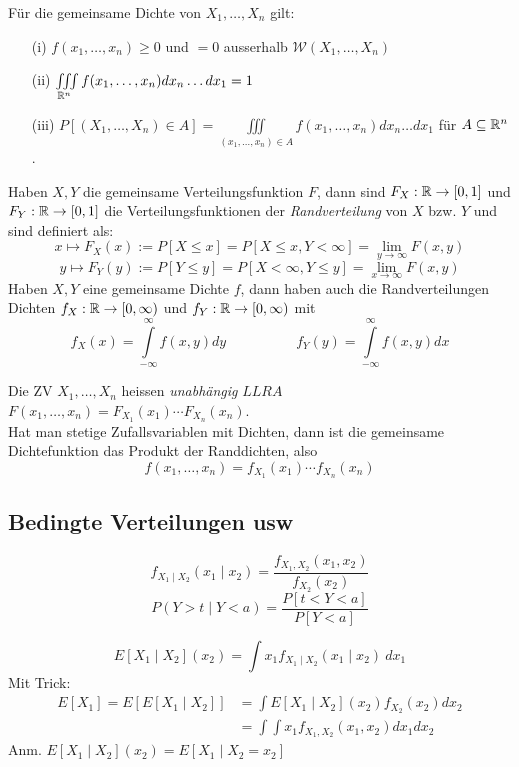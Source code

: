 \begin{korollar}
Für die gemeinsame Dichte von $X_1,\dots,X_n$ gilt:
\begin{itemize}
\item[(i)] $f(x_1,\dots, x_n) \geq 0$ und $=0$ ausserhalb $\mathcal{W}(X_1, \dots, X_n)$
\item[(ii)] $ \iiint \limits_{\mathbb{R}^n} f(x_1, \dots, x_n) dx_n \dots dx_1 = 1$
\item[(iii)] $P[(X_1,\dots, X_n) \in A] = \iiint \limits_{(x_1,\dots,x_n) \in A} f(x_1, \dots, x_n) dx_n \dots dx_1$ für $A\subseteq \mathbb{R}^n$.
\end{itemize}
\end{korollar}

\begin{definition}
Haben $X,Y$ die gemeinsame Verteilungsfunktion $F$, dann sind $F_X:\mathbb{R}\to[0,1]$ und $F_Y:\mathbb{R}\to[0,1]$ die Verteilungsfunktionen der \textit{Randverteilung} von $X$ bzw. $Y$ und sind definiert als:
$$ x \mapsto F_X(x) := P[X \leq x] = P[X \leq x, Y < \infty] = \lim_{y\to \infty} F(x,y)$$
$$ y \mapsto F_Y(y) := P[Y \leq y] = P[X < \infty, Y \leq y] = \lim_{x\to \infty} F(x,y)$$
Haben $X,Y$ eine gemeinsame Dichte $f$, dann haben auch die Randverteilungen Dichten $f_X:\mathbb{R}\to [0, \infty)$ und $f_Y:\mathbb{R} \to [0, \infty)$ mit
$$ f_X(x) = \int\limits_{-\infty}^{\infty} f(x,y) dy \quad \quad \quad \quad \quad f_Y(y) = \int \limits_{-\infty}^{\infty} f(x,y) dx$$
\end{definition}

\begin{definition}
Die ZV $X_1,\dots,X_n$ heissen \textit{unabhängig} $LLRA$ $F(x_1,\dots,x_n) = F_{X_1}(x_1) \cdots F_{X_n}(x_n)$.\\
Hat man stetige Zufallsvariablen mit Dichten, dann ist die gemeinsame Dichtefunktion das Produkt der Randdichten, also
$$ f(x_1, \dots, x_n) = f_{X_1}(x_1) \cdots f_{X_n}(x_n)$$
\end{definition}

\subsection{Bedingte Verteilungen usw}

\begin{definition}

$$ f_{X_1 \mid X_2}(x_1\mid x_2) = \frac{f_{X_1, X_2}(x_1, x_2)}{f_{X_2}(x_2)}$$
$$ P(Y > t\mid Y < a) = \frac{P[t < Y < a]}{P[Y < a]}$$

$$ E[X_1 \mid X_2](x_2) = \int x_1 f_{X_1 \mid X_2}(x_1\mid x_2)\ dx_1$$
Mit Trick:
\begin{align*}
	E[X_1] = E[E[X_1 \mid X_2]] &= \int E[X_1 \mid X_2](x_2) f_{X_2}(x_2) dx_2\\
	&=\int \int x_1 f_{X_1, X_2}(x_1, x_2) dx_1 dx_2
\end{align*}
Anm. $E[X_1 \mid X_2](x_2) = E[X_1 \mid X_2=x_2]$ 
\end{definition}

